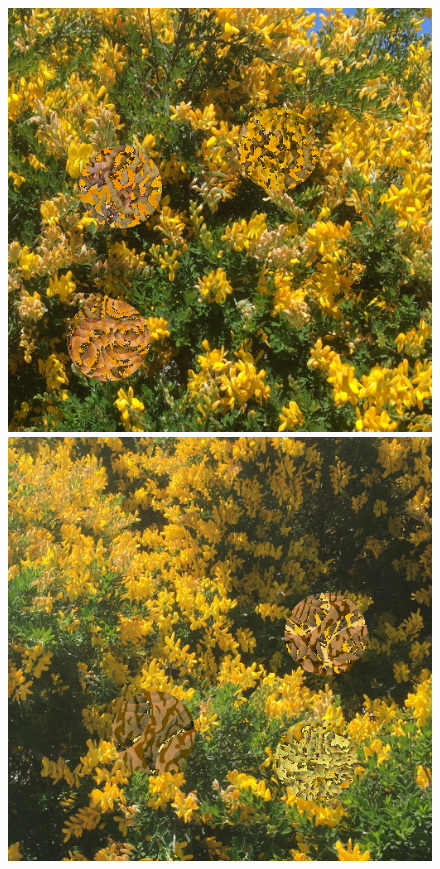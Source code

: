\documentclass[acmtog]{acmart}
\begin{document}
\begin{figure}
    \includegraphics[scale=0.24]{20221218_step_5396.png}
    \hfill
    \includegraphics[scale=0.24]{20221218_step_5641.png}

\end{figure}
\end{document}
